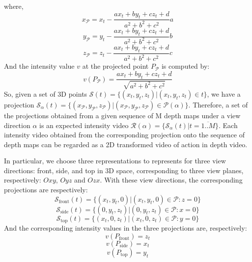 \documentclass[review]{elsarticle}
\begin{document}
where,
\begin{equation}
	x_\mathcal{P} = x_t - \frac{ax_t + by_t + cz_t + d}{a^2 + b^2 + c^2}a
\end{equation}
\begin{equation}
	y_\mathcal{P} = y_t - \frac{ax_t + by_t + cz_t + d}{a^2 + b^2 + c^2}b
\end{equation}
\begin{equation}
	z_\mathcal{P} = z_t - \frac{ax_t + by_t + cz_t + d}{a^2 + b^2 + c^2}c
\end{equation}
And the intensity value $v$ at the projected point $P_\mathcal{P}$ is computed by:
\begin{equation}
	v(P_\mathcal{P}) = \frac{ax_t + by_t + cz_t + d}{\sqrt{a^2 + b^2 + c^2}}
\end{equation}
So, given a set of 3D points $\mathcal{S}(t) = \{(x_t,y_t,z_t)\vert(x_t,y_t,z_t) \in t\}$, we have a projection $\mathcal{S}_\alpha(t) = \{(x_\mathcal{P},y_\mathcal{P},z_\mathcal{P})\vert(x_\mathcal{P},y_\mathcal{P},z_\mathcal{P}) \in \mathcal{P}(\alpha)\}$. Therefore, a set of the projections obtained from a given sequence of M depth maps under a view direction $\alpha$ is an expected intensity video $\mathcal{R}(\alpha) = \{\mathcal{S}_\alpha(t) \vert t=\overline{1..M}\}$. Each intensity video obtained from the corresponding projection onto the sequence of depth maps can be regarded as a 2D transformed video of action in depth video.

In particular, we choose three representations to represents for three view directions: front, side, and top in 3D space, corresponding to three view planes, respectively: $Oxy$, $Oyz$ and $Ozx$. With these view directions, the corresponding projections are respectively:
\begin{equation}
\mathcal{S}_\text{front}(t) = \{(x_t,y_t,0)\vert(x_t,y_t,0) \in \mathcal{P}:z=0\}
\end{equation}
\begin{equation}
\mathcal{S}_\text{side}(t) = \{(0,y_t,z_t)\vert(0,y_t,z_t) \in \mathcal{P}:x=0\}
\end{equation}
\begin{equation}
\mathcal{S}_\text{top}(t) = \{(x_t,0,z_t)\vert(x_t,0,z_t) \in \mathcal{P}:y=0\}
\end{equation}
And the corresponding intensity values in the three projections are, respectively:
\begin{equation}
	v(P_\text{front}) = z_t
\end{equation}
\begin{equation}
	v(P_\text{side}) = x_t
\end{equation}
\begin{equation}
	v(P_\text{top}) = y_t
\end{equation}
\end{document}
